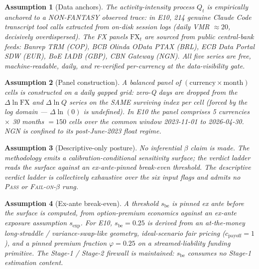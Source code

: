 \documentclass[11pt,letterpaper]{article}
\newcommand{\dln}{\Delta\ln}
\newcommand{\sbe}{s_{\mathrm{be}}}
\newcommand{\sexp}{s_{\mathrm{exp}}}
\newcommand{\Cfx}{\mathrm{FX}}
\theoremstyle{assumption}
\newtheorem{assumption}{Assumption}
\begin{document}
\begin{assumption}[Data anchors]\label{ass:A2}
The activity-intensity process $Q_t$ is empirically anchored to a NON-FANTASY
observed trace: in E10, 214 genuine Claude Code transcript tool calls
extracted from on-disk session logs (daily VMR $\approx 20$, decisively
overdispersed). The FX panels $\Cfx_t$ are sourced from public central-bank
feeds: Banrep TRM (COP), BCB Olinda OData PTAX (BRL), ECB Data Portal SDW
(EUR), BoE IADB (GBP), CBN Gateway (NGN). All five series are free,
machine-readable, daily, and re-verified per-currency at the data-visibility
gate.
\end{assumption}

\begin{assumption}[Panel construction]\label{ass:A3}
A balanced panel of $(\text{currency} \times \text{month})$ cells is
constructed on a daily gapped grid: zero-Q days are dropped from the
$\dln \Cfx$ and $\dln Q$ series on the SAME surviving index per cell
(forced by the log domain --- $\dln(0)$ is undefined). In E10 the panel
comprises 5 currencies $\times$ 30 months $= 150$ cells over the common
window 2023-11-01 to 2026-04-30. NGN is confined to its post-June-2023 float
regime.
\end{assumption}

\begin{assumption}[Descriptive-only posture]\label{ass:A4}
No inferential $\beta$ claim is made. The methodology emits a
calibration-conditional sensitivity surface; the verdict ladder reads the
surface against an ex-ante-pinned break-even threshold. The descriptive
verdict ladder is collectively exhaustive over the six input flags and
admits no \textsc{Pass} or \textsc{Fail-on-}$\beta$ rung.
\end{assumption}

\begin{assumption}[Ex-ante break-even]\label{ass:A5}
A threshold $\sbe$ is pinned ex ante before the surface is computed, from
option-premium economics against an ex-ante exposure assumption $\sexp$.
For E10, $\sbe = 0.25$ is derived from an at-the-money long-straddle /
variance-swap-like geometry, ideal-scenario fair pricing ($c_{\mathrm{payoff}} = 1$),
and a pinned premium fraction $\varphi = 0.25$ on a streamed-liability
funding primitive. The Stage-1 / Stage-2 firewall is maintained: $\sbe$
consumes no Stage-1 estimation content.
\end{assumption}

\end{document}
